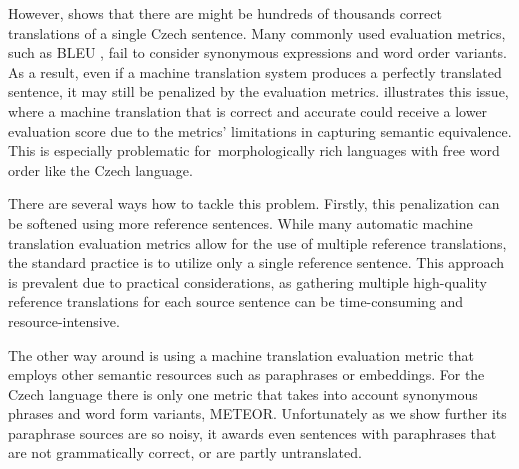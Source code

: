 However, \citep{bojar-scratching} shows that there are might be hundreds of thousands correct translations of a single Czech sentence. Many commonly used evaluation metrics, such as BLEU \citep{bleu}, fail to consider synonymous expressions and word order variants. As a result, even if a machine translation system produces a perfectly translated sentence, it may still be penalized by the evaluation metrics.  illustrates this issue, where a machine translation that is correct and accurate could receive a lower evaluation score due to the metrics' limitations in capturing semantic equivalence. This is especially problematic for~morphologically rich languages with free word order like the Czech language. \cite{bojar-tackling-sparse-data}

There are several ways how to tackle this problem. Firstly, this penalization can be softened using more reference sentences. While many automatic machine translation evaluation metrics allow for the use of multiple reference translations, the standard practice is to utilize only a single reference sentence. This approach is prevalent due to practical considerations, as gathering multiple high-quality reference translations for each source sentence can be time-consuming and resource-intensive. 

The other way around is using a machine translation evaluation metric that employs other semantic resources such as paraphrases or embeddings. 
For the Czech language there is only one metric that takes into account synonymous phrases and word form variants, METEOR. \cite{meteor}  Unfortunately as we show further its paraphrase sources are so noisy, it awards even sentences with paraphrases that are not grammatically correct, or are partly untranslated.



